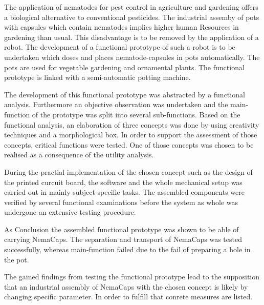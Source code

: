 \newpage
The application of nematodes for pest control in agriculture and gardening offers a biological alternative to conventional pesticides. The industrial assemby of pots with capsules which contain nematodes implies higher human Resources in gardening than usual. This disadvantage is to be removed by the application of a robot. The development of a functional prototype of such a robot is to be undertaken which doses and places nematode-capsules in pots automatically. The pots are used for vegetable gardening and ornamental plants. The functional prototype is linked with a semi-automatic potting machine.
\newline

The development of this functional prototype was abstracted by a functional analysis. Furthermore an objective observation was undertaken and the main-function of the prototype was split into several sub-functions. Based on the functional analysis, an elaboration of three concepts was done by using creativity techniques and a morphological box. In order to support the assessment of those concepts, critical functions were tested. One of those concepts was chosen to be realised as a consequence of the utility analysis.
\newline

During the practial implementation of the chosen concept such as the design of the printed curcuit board, the software and the whole mechanical setup was carried out in mainly subject-specific tasks. The assembled components were verified by several functional examinations before the system as whole was undergone an extensive testing procedure.
\newline

As Conclusion the assembled functional prototype was shown to be able of carrying NemaCaps. The separation and transport of NemaCaps was tested successfully, whereas main-function failed due to the fail of preparing a hole in the pot.
\newline

The gained findings from testing the functional prototype lead to the supposition that an industrial assembly of NemaCaps with the chosen concept is likely by changing specific parameter. In order to fulfill that conrete measures are listed.